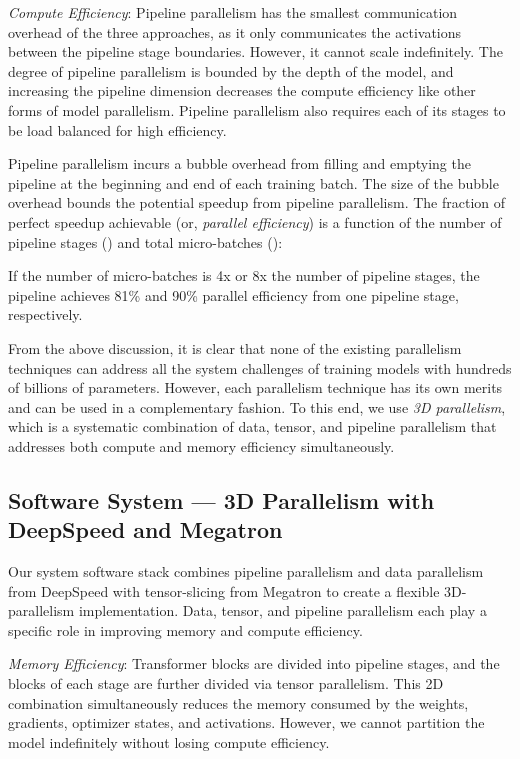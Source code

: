 \documentclass[11pt]{article}
\begin{document}
\textit{Compute Efficiency}: Pipeline parallelism has the smallest communication
overhead of the three approaches, as it only communicates the activations 
between the pipeline stage boundaries.
However, it cannot scale indefinitely. The degree of pipeline parallelism is 
bounded by the depth of the model, and increasing the pipeline dimension
decreases the compute efficiency like other forms of model parallelism.
Pipeline parallelism also requires each of its stages to be load
balanced for high efficiency.

Pipeline parallelism incurs a bubble overhead from filling and
emptying the pipeline at the beginning and end of each training batch. The size
of the bubble overhead bounds the potential speedup from pipeline parallelism.
The fraction of perfect speedup achievable (or, \emph{parallel efficiency}) 
is a function of the number of pipeline stages () and total micro-batches ():

If the number of micro-batches is 4x or 8x the number of pipeline stages,
the pipeline achieves 81\% and 90\% parallel efficiency from one  pipeline stage,
respectively.

From the above discussion, it is clear that none of the existing parallelism
techniques can address all the system challenges of training models with
hundreds of billions of parameters. However, each
parallelism technique has its own merits and can be used in a complementary
fashion.
To this end, we use \emph{3D parallelism}, which is a systematic combination of data, tensor, and pipeline
parallelism that addresses both compute and memory efficiency
simultaneously. 


\subsection{Software System --- 3D Parallelism with DeepSpeed and Megatron }

Our system software stack combines pipeline parallelism and data parallelism
from DeepSpeed with tensor-slicing from Megatron to create a flexible
3D-parallelism implementation. Data, tensor, and pipeline
parallelism each play a specific role in improving memory and compute
efficiency.

\textit{Memory Efficiency}: Transformer blocks are divided into pipeline
stages, and the blocks of each stage are further divided via tensor parallelism.
This 2D combination simultaneously reduces the memory consumed by the weights,
gradients, optimizer states, and activations. However, we cannot partition the model indefinitely without losing compute efficiency.
\end{document}
